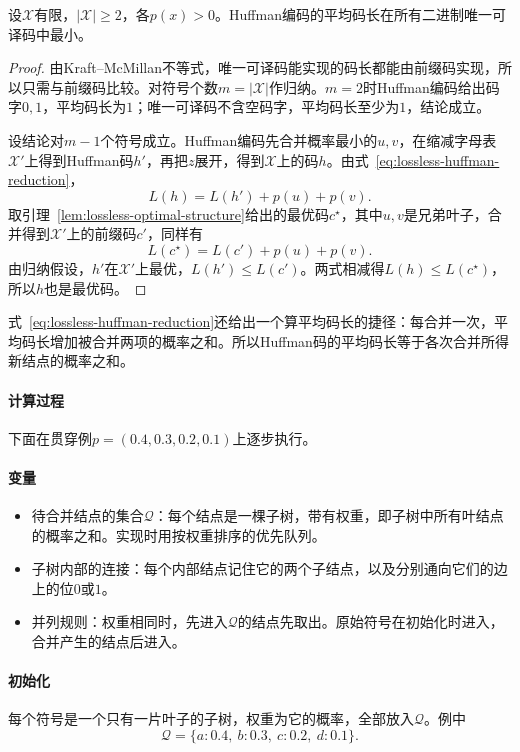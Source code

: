 \begin{theorem}[Huffman编码的最优性]
\label{thm:lossless-huffman-optimal}
设$\mathcal{X}$有限，$\lvert\mathcal{X}\rvert\geq2$，各$p(x)>0$。Huffman编码的平均码长在所有二进制唯一可译码中最小。
\end{theorem}

\begin{proof}
由Kraft–McMillan不等式，唯一可译码能实现的码长都能由前缀码实现，所以只需与前缀码比较。对符号个数$m=\lvert\mathcal{X}\rvert$作归纳。$m=2$时Huffman编码给出码字$0,1$，平均码长为$1$；唯一可译码不含空码字，平均码长至少为$1$，结论成立。

设结论对$m-1$个符号成立。Huffman编码先合并概率最小的$u,v$，在缩减字母表$\mathcal{X}'$上得到Huffman码$h'$，再把$z$展开，得到$\mathcal{X}$上的码$h$。由式~\eqref{eq:lossless-huffman-reduction}，
\[
 L(h)=L(h')+p(u)+p(v).
\]
取引理~\ref{lem:lossless-optimal-structure}给出的最优码$c^{\star}$，其中$u,v$是兄弟叶子，合并得到$\mathcal{X}'$上的前缀码$c'$，同样有
\[
 L(c^{\star})=L(c')+p(u)+p(v).
\]
由归纳假设，$h'$在$\mathcal{X}'$上最优，$L(h')\leq L(c')$。两式相减得$L(h)\leq L(c^{\star})$，所以$h$也是最优码。
\end{proof}

式~\eqref{eq:lossless-huffman-reduction}还给出一个算平均码长的捷径：每合并一次，平均码长增加被合并两项的概率之和。所以Huffman码的平均码长等于各次合并所得新结点的概率之和。

\paragraph{计算过程}
下面在贯穿例$p=(0.4,0.3,0.2,0.1)$上逐步执行。

\paragraph{变量}
\begin{itemize}
 \item 待合并结点的集合$\mathcal{Q}$：每个结点是一棵子树，带有权重，即子树中所有叶结点的概率之和。实现时用按权重排序的优先队列。
 \item 子树内部的连接：每个内部结点记住它的两个子结点，以及分别通向它们的边上的位$0$或$1$。
 \item 并列规则：权重相同时，先进入$\mathcal{Q}$的结点先取出。原始符号在初始化时进入，合并产生的结点后进入。
\end{itemize}

\paragraph{初始化}
每个符号是一个只有一片叶子的子树，权重为它的概率，全部放入$\mathcal{Q}$。例中
\[
 \mathcal{Q}=\{a:0.4,\ b:0.3,\ c:0.2,\ d:0.1\}.
\]

